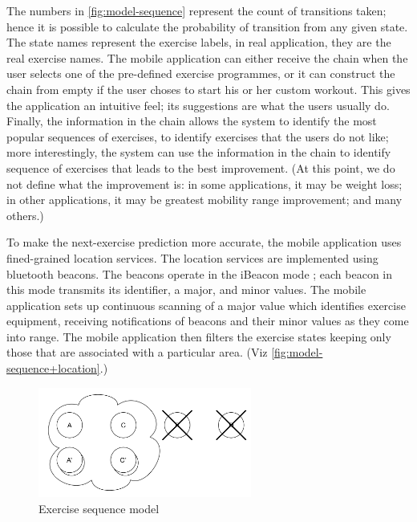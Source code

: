 \documentclass[a4paper, 10 pt, conference]{IEEEtran}
\begin{document}
The numbers in \autoref{fig:model-sequence} represent the count of transitions taken; hence it is possible to calculate the probability of transition from any given state. The state names represent the exercise labels, in real application, they are the real exercise names. The mobile application can either receive the chain when the user selects one of the pre-defined exercise programmes, or it can construct the chain from empty if the user choses to start his or her custom workout. This gives the application an intuitive feel; its suggestions are what the users usually do. Finally, the information in the chain allows the system to identify the most popular sequences of exercises, to identify exercises that the users do not like; more interestingly, the system can use the information in the chain to identify sequence of exercises that leads to the best improvement. (At this point, we do not define what the improvement is: in some applications, it may be weight loss; in other applications, it may be greatest mobility range improvement; and many others.)

To make the next-exercise prediction more accurate, the mobile application uses fined-grained location services. The location services are implemented using bluetooth beacons. The beacons operate in the iBeacon mode \cite{ibeacon}; each beacon in this mode transmits its identifier, a major, and minor values. The mobile application sets up continuous scanning of a major value which identifies exercise equipment, receiving notifications of beacons and their minor values as they come into range. The mobile application then filters the exercise states keeping only those that are associated with a particular area. (Viz \autoref{fig:model-sequence+location}.)

\begin{figure}[h]
	\begin{center}
		\caption{Exercise sequence model}
		\label{fig:model-sequence+location}
		\includegraphics[width=7cm,keepaspectratio]{ri-model-sequence+location.png}
	\end{center}
\end{figure}
\end{document}
